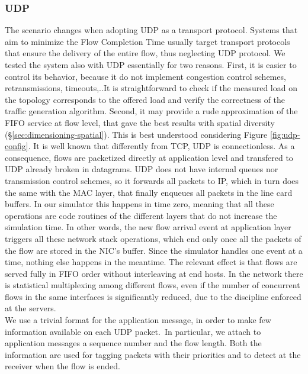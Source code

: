 \subsubsection{UDP}
\label{sec:udp-setup}
The scenario changes when adopting UDP as a transport protocol. Systems that aim to minimize the Flow Completion Time usually target transport protocols that ensure the delivery of the entire flow, thus neglecting UDP protocol. We tested the system also with UDP essentially for two reasons. First, it is easier to control its behavior, because it do not implement congestion control schemes, retransmissions, timeouts,..It is straightforward to check if the measured load on the topology corresponds to the offered load and verify the correctness of the traffic generation algorithm. Second, it may provide a rude approximation of the FIFO service at flow level, that gave the best results with spatial diversity (\S \ref{sec:dimensioning-spatial}). This is best understood considering Figure \ref{fig:udp-config}. It is well known that differently from TCP, UDP is connectionless. As a consequence, flows are packetized directly at application level and transfered to UDP already broken in datagrams. UDP does not have internal queues nor transmission control schemes, so it forwards all packets to IP, which in turn does the same with the MAC layer, that finally enqueues all packets in the line card buffers. In our simulator this happens in time zero, meaning that all these operations are code routines of the different layers that do not increase the simulation time. In other words, the new flow arrival event at application layer triggers all these network stack operations, which end only once all the packets of the flow are stored in the NIC's buffer. Since the simulator handles one event at a time, nothing else happens in the meantime. The relevant effect is that flows are served fully in FIFO order without interleaving at end hosts. In the network there is statistical multiplexing among different flows, even if the number of concurrent flows in the same interfaces is significantly reduced, due to the discipline enforced at the servers.\\
We use a trivial format for the application message, in order to make few information available on each UDP packet. In particular, we attach to application messages a sequence number and the flow length. Both the information are used for tagging packets with their priorities and to detect at the receiver when the flow is ended.
